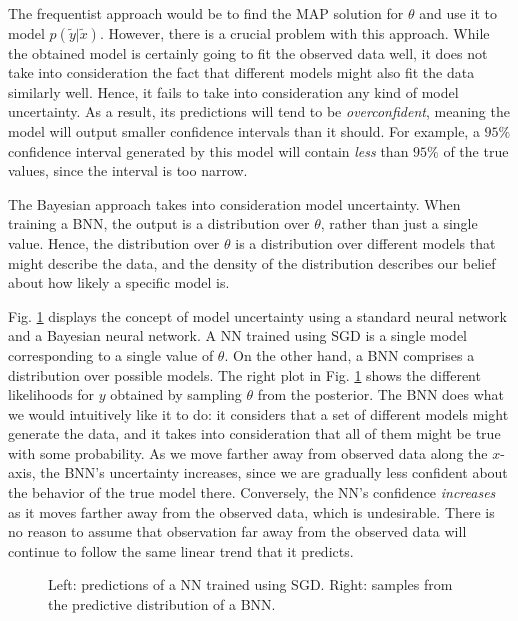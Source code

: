 \documentclass[12pt]{article}
\begin{document}
The frequentist approach would be to find the MAP solution for $\theta$ and use it to model $p(\tilde{y} | \tilde{x})$. However, there is a crucial problem with this approach. While the obtained model is certainly going to fit the observed data well, it does not take into consideration the fact that different models might also fit the data similarly well. Hence, it fails to take into consideration any kind of model uncertainty. As a result, its predictions will tend to be \textit{overconfident}, meaning the model will output smaller confidence intervals than it should. For example, a $95\%$ confidence interval generated by this model will contain \textit{less} than $95\%$ of the true values, since the interval is too narrow.

The Bayesian approach takes into consideration model uncertainty. When training a BNN, the output is a distribution over $\theta$, rather than just a single value. Hence, the distribution over $\theta$ is a distribution over different models that might describe the data, and the density of the distribution describes our belief about how likely a specific model is.

Fig. \ref{fig_1d_predictions_overlaid} displays the concept of model uncertainty using a standard neural network and a Bayesian neural network. A NN trained using SGD is a single model corresponding to a single value of $\theta$. On the other hand, a BNN comprises a distribution over possible models. The right plot in Fig. \ref{fig_1d_predictions_overlaid} shows the different likelihoods for $y$ obtained by sampling $\theta$ from the posterior. The BNN does what we would intuitively like it to do: it considers that a set of different models might generate the data, and it takes into consideration that all of them might be true with some probability. As we move farther away from observed data along the $x$-axis, the BNN's uncertainty increases, since we are gradually less confident about the behavior of the true model there. Conversely, the NN's confidence \textit{increases} as it moves farther away from the observed data, which is undesirable. There is no reason to assume that observation far away from the observed data will continue to follow the same linear trend that it predicts.

\begin{figure}[H]
\centering
{}
\caption{Left: predictions of a NN trained using SGD. Right: samples from the predictive distribution of a BNN.}
\label{fig_1d_predictions_overlaid}
\end{figure}
\end{document}

